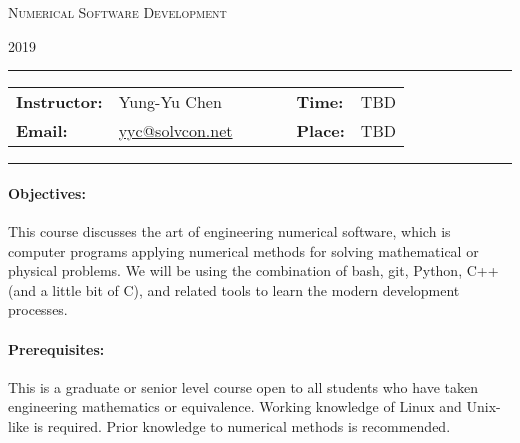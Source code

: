 \documentclass[11pt,a4paper]{article}
\begin{document}
\begin{center}
{\Large \textsc{Numerical Software Development}}
\end{center}
\begin{center}
2019
\end{center}

\begin{center}
\rule{6in}{0.4pt}
\begin{minipage}[t]{.75\textwidth}
\begin{tabular}{llcccll}
\textbf{Instructor:} & Yung-Yu Chen & & &  &
\textbf{Time:} & TBD \\
\textbf{Email:} & \href{mailto:yyc@solvcon.net}{yyc@solvcon.net} & & & &
\textbf{Place:} & TBD
\end{tabular}
\end{minipage}
\rule{6in}{0.4pt}
\end{center}



\paragraph{Objectives:}

This course discusses the art of engineering numerical software, which is
computer programs applying numerical methods for solving mathematical or
physical problems.  We will be using the combination of bash, git, Python, C++
(and a little bit of C), and related tools to learn the modern development
processes.

\paragraph{Prerequisites:}

This is a graduate or senior level course open to all students who have taken
engineering mathematics or equivalence.  Working knowledge of Linux and
Unix-like is required.  Prior knowledge to numerical methods is recommended.
\end{document}
